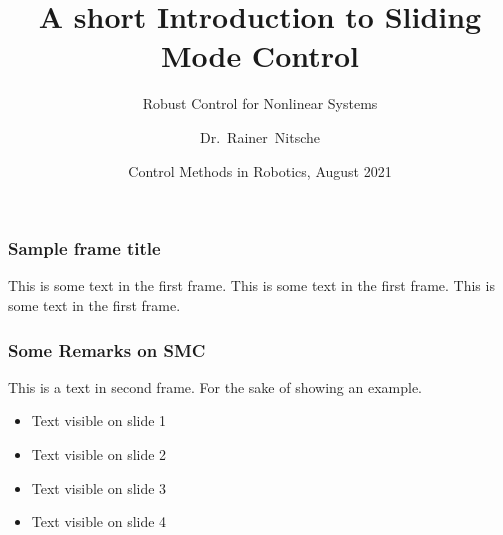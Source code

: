 \documentclass{beamer}
\title[Sliding Mode Control] %
{A short Introduction to Sliding Mode Control}
\subtitle{Robust Control for Nonlinear Systems}
\author[Rainer Nitsche] %
{Dr.~Rainer~Nitsche\inst{1}} %
\institute[Festo SE \& Co. KG] %
{
  \inst{1}%
  Dept. Robotics\\
 System Design Group
}
\date[ \today] %
{Control Methods in Robotics, August 2021}
\begin{document}
\frame{\titlepage}

\begin{frame}
\frametitle{Sample frame title}
This is some text in the first frame. This is some text in the first frame. This is some text in the first frame.
\end{frame}

\begin{frame}
\frametitle{Some Remarks on SMC}
This is a text in second frame. 
For the sake of showing an example.

\begin{itemize}
 \item<1-> Text visible on slide 1
 \item<2-> Text visible on slide 2
 \item<3> Text visible on slide 3
 \item<4-> Text visible on slide 4
\end{itemize}
\end{frame}



\end{document}
